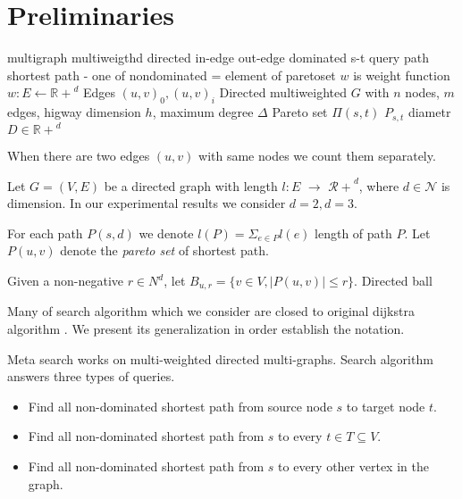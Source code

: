 
\section{Preliminaries}

multigraph 
multiweigthd
directed
in-edge out-edge
dominated
s-t query
path
shortest path - one of nondominated = element of paretoset
$w$ is weight function $w: E \leftarrow \mathbb{R+}^d$
Edges $(u,v)_0,(u,v)_i$
Directed multiweighted $G$ with
$n$ nodes,
$m$ edges, 
higway dimension $h$,
maximum degree $\Delta$
Pareto set $\Pi(s,t)$ $P_{s,t}$
diametr $D \in \mathbb{R+}^d$

When there are two edges $(u,v)$ with same nodes we count them
separately. 


Let $G = (V,E)$ be a directed graph with length
$l: E$ 
$ \rightarrow $
$\mathcal{R+}^d$, 
where $d \in \mathcal{N}$ is
dimension. In our experimental results
we consider $d=2, d=3$.

For each path $P(s,d)$ we denote 
$l(P) = \Sigma_{e\in P} l(e) $
length of path $P$.
Let $P(u,v)$ denote the \emph{pareto set} of shortest path.

Given a non-negative $r \in \mathcal{}{N}^d $, let $B_{u,r} = 
\{ v \in V, |P(u,v)| \le r \} $.
Directed ball



Many of search algorithm which we consider
are closed to original dijkstra algorithm \cite{dijkstra1959note}.
We present its generalization in order establish the notation.

Meta search works on multi-weighted directed multi-graphs. 
Search algorithm answers three types of queries.
\begin{itemize}
\item Find all non-dominated shortest path from source node $s$ to target node $t$.
\item Find all non-dominated shortest path from $s$ to every $t \in T \subseteq V$.
\item Find all non-dominated shortest path from $s$ to every other vertex in the graph.
\end{itemize}

